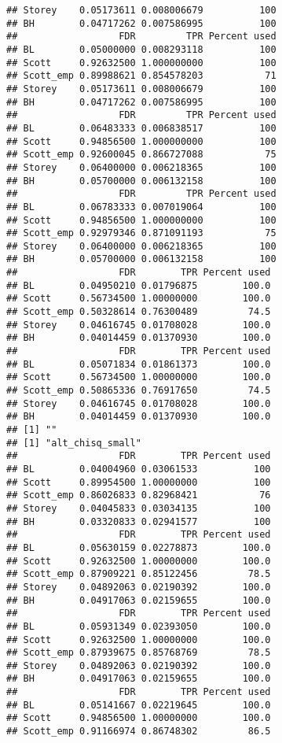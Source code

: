 \documentclass{article}\usepackage[]{graphicx}\usepackage[]{color}
\makeatletter
\newenvironment{kframe}{%
 \def\at@end@of@kframe{}%
 \ifinner\ifhmode%
  \def\at@end@of@kframe{\end{minipage}}%
  \begin{minipage}{\columnwidth}%
 \fi\fi%
 \def\FrameCommand##1{\hskip\@totalleftmargin \hskip-\fboxsep
 \colorbox{shadecolor}{##1}\hskip-\fboxsep
     \hskip-\linewidth \hskip-\@totalleftmargin \hskip\columnwidth}%
 \MakeFramed {\advance\hsize-\width
   \@totalleftmargin\z@ \linewidth\hsize
   \@setminipage}}%
 {\par\unskip\endMakeFramed%
 \at@end@of@kframe}
\newenvironment{knitrout}{}{} %
\makeatother
\begin{document}
\begin{knitrout}
\begin{kframe}
\begin{verbatim}
## Storey    0.05173611 0.008006679          100
## BH        0.04717262 0.007586995          100
##                  FDR         TPR Percent used
## BL        0.05000000 0.008293118          100
## Scott     0.92632500 1.000000000          100
## Scott_emp 0.89988621 0.854578203           71
## Storey    0.05173611 0.008006679          100
## BH        0.04717262 0.007586995          100
##                  FDR         TPR Percent used
## BL        0.06483333 0.006838517          100
## Scott     0.94856500 1.000000000          100
## Scott_emp 0.92600045 0.866727088           75
## Storey    0.06400000 0.006218365          100
## BH        0.05700000 0.006132158          100
##                  FDR         TPR Percent used
## BL        0.06783333 0.007019064          100
## Scott     0.94856500 1.000000000          100
## Scott_emp 0.92979346 0.871091193           75
## Storey    0.06400000 0.006218365          100
## BH        0.05700000 0.006132158          100
##                  FDR        TPR Percent used
## BL        0.04950210 0.01796875        100.0
## Scott     0.56734500 1.00000000        100.0
## Scott_emp 0.50328614 0.76300489         74.5
## Storey    0.04616745 0.01708028        100.0
## BH        0.04014459 0.01370930        100.0
##                  FDR        TPR Percent used
## BL        0.05071834 0.01861373        100.0
## Scott     0.56734500 1.00000000        100.0
## Scott_emp 0.50865336 0.76917650         74.5
## Storey    0.04616745 0.01708028        100.0
## BH        0.04014459 0.01370930        100.0
## [1] ""
## [1] "alt_chisq_small"
##                  FDR        TPR Percent used
## BL        0.04004960 0.03061533          100
## Scott     0.89954500 1.00000000          100
## Scott_emp 0.86026833 0.82968421           76
## Storey    0.04045833 0.03034135          100
## BH        0.03320833 0.02941577          100
##                  FDR        TPR Percent used
## BL        0.05630159 0.02278873        100.0
## Scott     0.92632500 1.00000000        100.0
## Scott_emp 0.87909221 0.85122456         78.5
## Storey    0.04892063 0.02190392        100.0
## BH        0.04917063 0.02159655        100.0
##                  FDR        TPR Percent used
## BL        0.05931349 0.02393050        100.0
## Scott     0.92632500 1.00000000        100.0
## Scott_emp 0.87939675 0.85768769         78.5
## Storey    0.04892063 0.02190392        100.0
## BH        0.04917063 0.02159655        100.0
##                  FDR        TPR Percent used
## BL        0.05141667 0.02219645        100.0
## Scott     0.94856500 1.00000000        100.0
## Scott_emp 0.91166974 0.86748302         86.5

\end{verbatim}
\end{kframe}
\end{knitrout}
\end{document}
